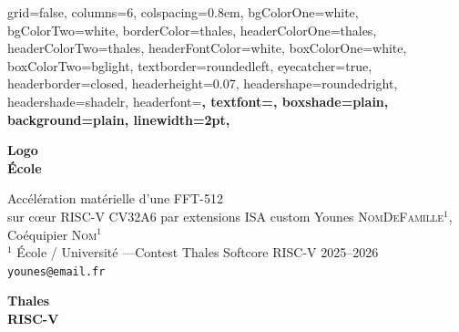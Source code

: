 \documentclass[final,a1paper,fontscale=0.26]{baposter}
\begin{document}
\begin{poster}%
  {
  grid=false,
  columns=6,
  colspacing=0.8em,
  bgColorOne=white,
  bgColorTwo=white,
  borderColor=thales,
  headerColorOne=thales,
  headerColorTwo=thales,
  headerFontColor=white,
  boxColorOne=white,
  boxColorTwo=bglight,
  textborder=roundedleft,
  eyecatcher=true,
  headerborder=closed,
  headerheight=0.07\textheight,
  headershape=roundedright,
  headershade=shadelr,
  headerfont=\Large\bf\textsf,
  textfont={\setlength{\parindent}{0em}},
  boxshade=plain,
  background=plain,
  linewidth=2pt,
  }
  {
    \begin{minipage}{0.10\linewidth}
      \centering
      \vspace{0.5em}
      \textbf{\small\textsf{Logo}}\\
      \textbf{\small\textsf{École}}
    \end{minipage}
  }
  {\textsf{\LARGE Accélération matérielle d'une FFT-512 \\[0.2em]
  sur cœur RISC-V CV32A6 par extensions ISA custom}\vspace{0.3em}}
  {\normalsize\textsf{
    Younes \textsc{NomDeFamille}$^{1}$, Co\'{e}quipier \textsc{Nom}$^{1}$ \\[0.1em]
    {\small $^1$ École / Université \quad---\quad Contest Thales Softcore RISC-V 2025--2026}\\
    {\small\tt younes@email.fr}
  }}
  {
    \begin{minipage}{0.10\linewidth}
      \centering
      \vspace{0.5em}
      \textbf{\small\textsf{Thales}}\\
      \textbf{\small\textsf{RISC-V}}
    \end{minipage}
  }











\end{poster}
\end{document}
